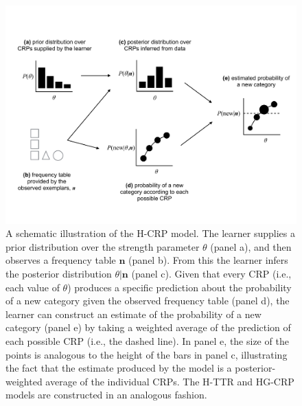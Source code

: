 \documentclass[doc]{apa6}
\begin{document}
\begin{figure}
\begin{center}
\includegraphics[scale=0.4]{hcrp_schematic.pdf}
\caption{A schematic illustration of the H-CRP model. The learner supplies a prior distribution over the strength parameter $\theta$ (panel a), and then observes a frequency table $\bm{n}$ (panel b). From this the learner infers the posterior distribution $\theta|\bm{n}$ (panel c). Given that every CRP (i.e., each value of $\theta$) produces a specific prediction about the probability of a new category given the observed frequency table (panel d), the learner can construct an estimate of the probability of a new category (panel e) by taking a weighted average of the prediction of each possible CRP (i.e., the dashed line). In panel e, the size of the points is analogous to the height of the bars in panel c, illustrating the fact that the estimate produced by the model is a posterior-weighted average of the individual CRPs. The H-TTR and HG-CRP models are constructed in an analogous fashion.}
\label{schematic}
\end{center}
\end{figure}
\end{document}
